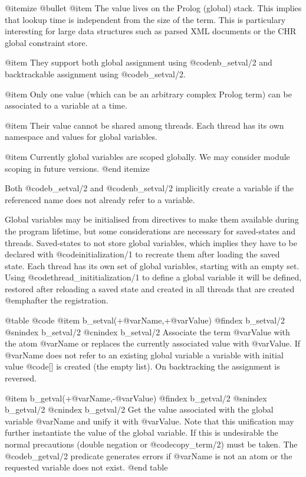 @itemize @bullet
@item The value lives on the Prolog (global) stack.  This implies 
          that lookup time is independent from the size of the term.
	  This is particulary interesting for large data structures
	  such as parsed XML documents or the CHR global constraint
	  store.

@item They support both global assignment using @code{nb_setval/2} and
          backtrackable assignment using @code{b_setval/2}.

@item Only one value (which can be an arbitrary complex Prolog
   	  term) can be associated to a variable at a time.

@item Their value cannot be shared among threads.  Each thread
          has its own namespace and values for global variables.

@item Currently global variables are scoped globally.  We may
          consider module scoping in future versions.
@end itemize

Both @code{b_setval/2} and @code{nb_setval/2} implicitly create a variable if the
referenced name does not already refer to a variable.

Global variables may be initialised from directives to make them
available during the program lifetime, but some considerations are
necessary for saved-states and threads. Saved-states to not store global
variables, which implies they have to be declared with @code{initialization/1}
to recreate them after loading the saved state.  Each thread has
its own set of global variables, starting with an empty set.  Using
@code{thread_inititialization/1} to define a global variable it will be
defined, restored after reloading a saved state and created in all
threads that are created @emph{after} the registration.


@table @code
@item b_setval(+@var{Name},+@var{Value})
@findex b_setval/2
@snindex b_setval/2
@cnindex b_setval/2
Associate the term @var{Value} with the atom @var{Name} or replaces
the currently associated value with @var{Value}.  If @var{Name} does
not refer to an existing global variable a variable with initial value
@code{[]} is created (the empty list).  On backtracking the
assignment is reversed.

@item b_getval(+@var{Name},-@var{Value})
@findex b_getval/2
@snindex b_getval/2
@cnindex b_getval/2
Get the value associated with the global variable @var{Name} and unify
it with @var{Value}. Note that this unification may further instantiate
the value of the global variable. If this is undesirable the normal
precautions (double negation or @code{copy_term/2}) must be taken. The
@code{b_getval/2} predicate generates errors if @var{Name} is not an atom or
the requested variable does not exist.
@end table


